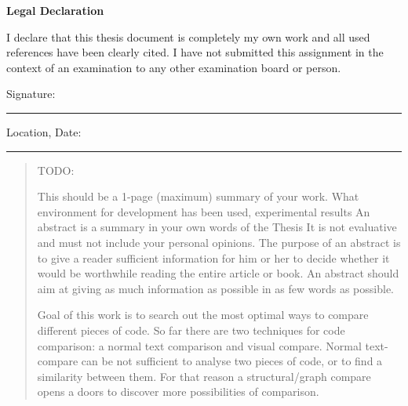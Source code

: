 \documentclass{report}
\begin{document}
\onehalfspacing
\null\vfil
\begin{center}{\huge\bf Legal Declaration\par}\end{center}
\null
I declare that this thesis document is completely my own work and all used references have been clearly cited. I have not submitted this assignment in the context of an examination to any other examination board or person.\\[2.5cm]

\begin{flushleft}
Signature:\\
\rule[1em]{25em}{0.5pt} %
 
Location, Date:\\
\rule[1em]{25em}{0.5pt} %
\end{flushleft}


\newpage
\pagestyle{fancy}
\fancyhead{}
\renewcommand{\headrulewidth}{0pt}
\renewcommand{\footrulewidth}{0.4pt}
\begin{abstract}
\large

TODO:
\par 
This should be a 1-page (maximum) summary of your work. What environment for development has been used, experimental results 
An abstract is a summary in your own words of the Thesis It is not evaluative and must not include your personal opinions. The purpose of an abstract is to give a reader sufficient information for him or her to decide whether it would be worthwhile reading the entire article or book. An abstract should aim at giving as much information as possible in as few words as possible. 
\par 
Goal of this work is to search out the most optimal ways to compare different pieces of code. So far there are two techniques for code comparison: a normal text comparison and visual compare. Normal text-compare can be not sufficient to analyse two pieces of code, or to find a similarity between them. For that reason a structural/graph compare opens a doors to discover more possibilities of comparison. 

\end{abstract}
\end{document}
